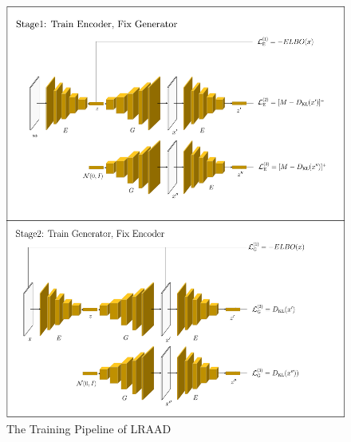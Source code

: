 \documentclass{article}
\begin{document}
\begin{figure}[H]
    \centering
    \includegraphics[width=\textwidth]{./assets/lraad.pdf}
    \caption{The Training Pipeline of LRAAD}
    \label{fig:lraad}
\end{figure}
\end{document}
